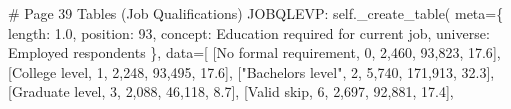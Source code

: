 \documentclass[
  11pt,
  a4paper,
]{article}
\newenvironment{Shaded}{\begin{snugshade}}{\end{snugshade}}
\newcommand{\CommentTok}[1]{\textcolor[rgb]{0.37,0.37,0.37}{#1}}
\newcommand{\NormalTok}[1]{\textcolor[rgb]{0.00,0.23,0.31}{#1}}
\newcommand{\OperatorTok}[1]{\textcolor[rgb]{0.37,0.37,0.37}{#1}}
\newcommand{\StringTok}[1]{\textcolor[rgb]{0.13,0.47,0.30}{#1}}
\newcommand{\VariableTok}[1]{\textcolor[rgb]{0.07,0.07,0.07}{#1}}
\begin{document}
\begin{Shaded}
\begin{Highlighting}[]
    \CommentTok{\# Page 39 Tables (Job Qualifications)}
    \StringTok{\textquotesingle{}JOBQLEVP\textquotesingle{}}\NormalTok{: }\VariableTok{self}\NormalTok{.\_create\_table(}
\NormalTok{        meta}\OperatorTok{=}\NormalTok{\{}
            \StringTok{\textquotesingle{}length\textquotesingle{}}\NormalTok{: }\StringTok{\textquotesingle{}1.0\textquotesingle{}}\NormalTok{, }\StringTok{\textquotesingle{}position\textquotesingle{}}\NormalTok{: }\StringTok{\textquotesingle{}93\textquotesingle{}}\NormalTok{,}
            \StringTok{\textquotesingle{}concept\textquotesingle{}}\NormalTok{: }\StringTok{\textquotesingle{}Education required for current job\textquotesingle{}}\NormalTok{,}
            \StringTok{\textquotesingle{}universe\textquotesingle{}}\NormalTok{: }\StringTok{\textquotesingle{}Employed respondents\textquotesingle{}}
\NormalTok{        \},}
\NormalTok{        data}\OperatorTok{=}\NormalTok{[}
\NormalTok{            [}\StringTok{\textquotesingle{}No formal requirement\textquotesingle{}}\NormalTok{, }\StringTok{\textquotesingle{}0\textquotesingle{}}\NormalTok{, }\StringTok{\textquotesingle{}2,460\textquotesingle{}}\NormalTok{, }\StringTok{\textquotesingle{}93,823\textquotesingle{}}\NormalTok{, }\StringTok{\textquotesingle{}17.6\textquotesingle{}}\NormalTok{],}
\NormalTok{            [}\StringTok{\textquotesingle{}College level\textquotesingle{}}\NormalTok{, }\StringTok{\textquotesingle{}1\textquotesingle{}}\NormalTok{, }\StringTok{\textquotesingle{}2,248\textquotesingle{}}\NormalTok{, }\StringTok{\textquotesingle{}93,495\textquotesingle{}}\NormalTok{, }\StringTok{\textquotesingle{}17.6\textquotesingle{}}\NormalTok{],}
\NormalTok{            [}\StringTok{"Bachelor\textquotesingle{}s level"}\NormalTok{, }\StringTok{\textquotesingle{}2\textquotesingle{}}\NormalTok{, }\StringTok{\textquotesingle{}5,740\textquotesingle{}}\NormalTok{, }\StringTok{\textquotesingle{}171,913\textquotesingle{}}\NormalTok{, }\StringTok{\textquotesingle{}32.3\textquotesingle{}}\NormalTok{],}
\NormalTok{            [}\StringTok{\textquotesingle{}Graduate level\textquotesingle{}}\NormalTok{, }\StringTok{\textquotesingle{}3\textquotesingle{}}\NormalTok{, }\StringTok{\textquotesingle{}2,088\textquotesingle{}}\NormalTok{, }\StringTok{\textquotesingle{}46,118\textquotesingle{}}\NormalTok{, }\StringTok{\textquotesingle{}8.7\textquotesingle{}}\NormalTok{],}
\NormalTok{            [}\StringTok{\textquotesingle{}Valid skip\textquotesingle{}}\NormalTok{, }\StringTok{\textquotesingle{}6\textquotesingle{}}\NormalTok{, }\StringTok{\textquotesingle{}2,697\textquotesingle{}}\NormalTok{, }\StringTok{\textquotesingle{}92,881\textquotesingle{}}\NormalTok{, }\StringTok{\textquotesingle{}17.4\textquotesingle{}}\NormalTok{],}

\end{Highlighting}
\end{Shaded}
\end{document}
